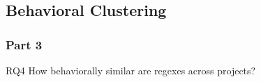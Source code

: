 \subsection{Behavioral Clustering}
\begin{frame}
\frametitle{Part 3}

\begin{block}{RQ4}
How behaviorally similar are regexes across projects?
\end{block}
\end{frame}

%


%

